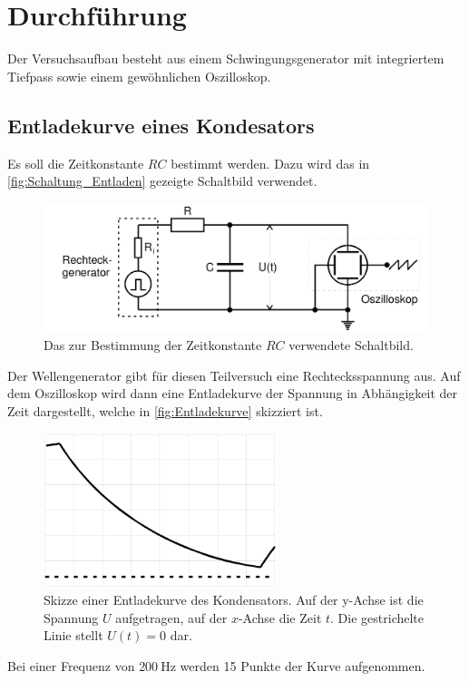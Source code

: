 \section{Durchführung}
\label{sec:Durchführung}
Der Versuchsaufbau besteht aus einem Schwingungsgenerator mit 
integriertem Tiefpass sowie einem gewöhnlichen Oszilloskop.
\subsection{Entladekurve eines Kondesators}
Es soll die Zeitkonstante $RC$ bestimmt werden. Dazu wird das in 
\autoref{fig:Schaltung_Entladen} gezeigte Schaltbild verwendet.
\begin{figure}
    \centering
    \includegraphics[width=\textwidth]{messdaten/Schaltung_Entladung.png}
    \caption{Das zur Bestimmung der Zeitkonstante $RC$ verwendete Schaltbild.}
    \label{fig:Schaltung_Entladung}
\end{figure}
Der Wellengenerator gibt für diesen Teilversuch eine Rechtecksspannung aus.
Auf dem Oszilloskop wird dann eine Entladekurve der Spannung in Abhängigkeit
der Zeit dargestellt, welche in \autoref{fig:Entladekurve} skizziert ist.
\begin{figure}[H]
    \centering
    \includegraphics[height=4.5cm]{messdaten/Entladekurve.png}
    \caption{Skizze einer Entladekurve des Kondensators. Auf der y-Achse ist
    die Spannung $U$ aufgetragen, auf der $x$-Achse die Zeit $t$. Die gestrichelte
    Linie stellt $U(t)=0$ dar.}
    \label{fig:Entladekurve}
\end{figure}
Bei einer Frequenz von $\qty{200}{\hertz}$ werden 15 Punkte der Kurve aufgenommen. 
